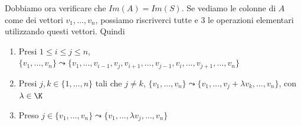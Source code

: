 \documentclass[11pt, a4paper, titlepage, oneside]{scrbook}
\begin{document}
Dobbiamo ora verificare che $Im(A) = Im(S)$. Se vediamo le colonne di $A$ come dei vettori $v_1, \ldots, v_n$, possiamo riscriverci tutte e 3 le operazioni elementari utilizzando questi vettori. Quindi
\begin{enumerate}
    \item Presi $1 \leq i \leq j \leq n$, $\{v_1, \ldots, v_n\} \leadsto \{v_1, \ldots, v_{i-1}, v_j, v_{i+1}, \ldots, v_{j-1}, v_i, \ldots, v_{j+1}, \ldots, v_n\}$
    \item Presi $j,k \in \{1, \ldots, n\}$ tali che $j \neq k$, $\{v_1, \ldots, v_n\} \leadsto \{v_1, \ldots, v_j + \lambda v_k, \ldots, v_n\}$, con $\lambda \in \K$
    \item Preso $j \in \{v_1, \ldots, v_n\} \leadsto \{v_1, \ldots, \lambda v_j, \ldots, v_n\}$
\end{enumerate}
\end{document}
